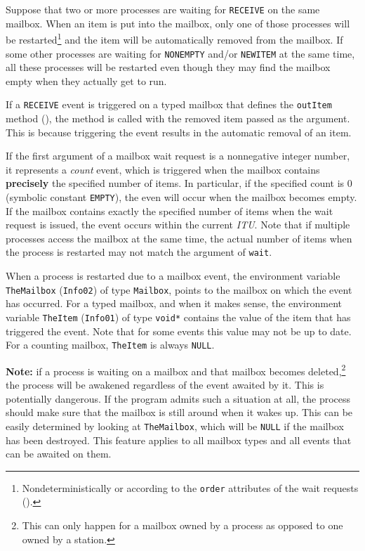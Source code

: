 Suppose that two or more processes are waiting for {\tt RECEIVE} on the
same mailbox.
When an item is put into the mailbox, only one of those processes
will be restarted\footnote{Nondeterministically or according to the
{\tt order} attributes of
the wait requests ().} and the item
will be automatically removed from the mailbox.
If some other processes are waiting for {\tt NONEMPTY} and/or {\tt NEWITEM} at
the same time, all these processes will be restarted even though they may
find the mailbox empty when they actually get to run.

If a {\tt RECEIVE} event is triggered on a typed mailbox that defines the
{\tt outItem} method (), the method is called
with the removed item passed as the argument.
This is because triggering the event results in the automatic removal of
an item.

If the first argument of a mailbox wait request is a nonnegative integer
number, it represents a {\em count\/} event, which is
triggered when the mailbox contains {\bf precisely} the specified number
of items.
In particular, if the specified count is 0 (symbolic constant {\tt EMPTY}),
the even will occur when the mailbox becomes empty.
If the mailbox contains exactly the specified number of items when
the wait request is issued, the event occurs within the current {\em ITU}.
Note that if multiple processes access the mailbox at the same
time, the actual number of items
when the process is restarted may not match the argument of {\tt wait}.

When a process is restarted due to a mailbox event, the environment variable
{\tt TheMailbox} ({\tt Info02})
of type {\tt Mailbox}, points to the mailbox on which the event has occurred.
For a typed mailbox, and when it makes sense, the environment variable
{\tt TheItem} ({\tt Info01}) of type {\tt void*} contains the value of
the item that has triggered the event.
Note that for some events this value may not be up to date.
For a counting mailbox, {\tt TheItem} is always {\tt NULL}.

\noindent
{\bf Note:} if a process is waiting on a mailbox and that mailbox becomes
deleted,\footnote{This can only happen for a mailbox owned by a process as
opposed to one owned by a station.}
the process will be awakened regardless of the event awaited by it.
This is potentially dangerous.
If the program admits such a situation at all, the process should make
sure that the mailbox is still around when it wakes up.
This can be easily determined by looking at {\tt TheMailbox}, which will be
{\tt NULL} if the mailbox has been destroyed.
This feature applies to all mailbox types and all events that can be
awaited on them.

